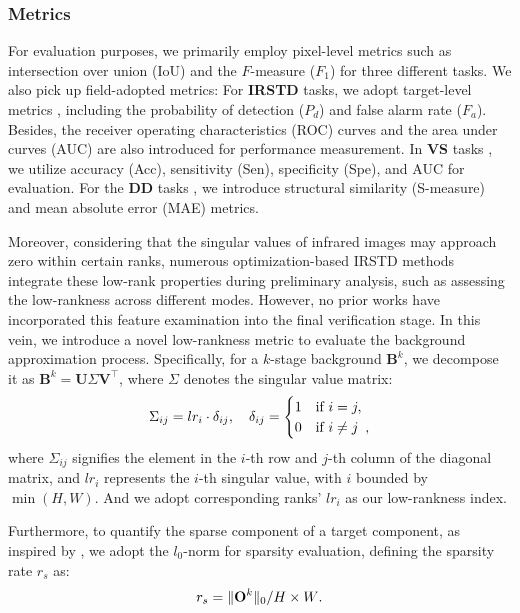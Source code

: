 \documentclass[10pt,journal,compsoc]{IEEEtran}
\begin{document}
\subsubsection{Metrics}
\label{sec:4.1.3}
For evaluation purposes, we primarily employ pixel-level metrics such as intersection over union (IoU) and the \(F\)-measure (\(F_1\)) for three different tasks. We also pick up field-adopted metrics: For \textbf{IRSTD} tasks, we adopt target-level metrics \cite{ying-2023-lesps}, including the probability of detection (\(P_d\)) and false alarm rate (\(F_a\)). Besides, the receiver operating characteristics (ROC) curves and the area under curves (AUC) are also introduced for performance measurement. In \textbf{VS} tasks \cite{liu-2022-frunet}, we utilize accuracy (Acc), sensitivity (Sen), specificity (Spe), and AUC for evaluation. For the \textbf{DD} tasks \cite{song-2020-MCITF}, we introduce structural similarity (S-measure) and mean absolute error (MAE) metrics.

Moreover, considering that the singular values of infrared images may approach zero within certain ranks, numerous optimization-based IRSTD methods integrate these low-rank properties during preliminary analysis, such as assessing the low-rankness across different modes. However, no prior works have incorporated this feature examination into the final verification stage. In this vein, we introduce a novel low-rankness metric to evaluate the background approximation process. Specifically, for a \(k\)-stage background \(\mathbf{B}^k\), we decompose it as \(\mathbf{B}^k = \mathbf{U} \Sigma \mathbf{V}^\top\), where \(\Sigma\) denotes the singular value matrix:
\begin{equation}
\setlength{\abovedisplayskip}{2pt}
\setlength{\belowdisplayskip}{2pt}
    \Sigma_{ij} = lr_i \cdot \delta_{ij}, \quad \delta_{ij} = 
    \begin{cases} 
    1 & \text{if } i = j, \\
    0 & \text{if } i \neq j\enspace,
    \end{cases}
\end{equation}
where \( \Sigma_{ij} \) signifies the element in the \( i \)-th row and \( j \)-th column of the diagonal matrix, and \( lr_i \) represents the \( i \)-th singular value, with \( i \) bounded by \(\min(H,W)\). And we adopt corresponding ranks' \( lr_i \) as our low-rankness index.

Furthermore, to quantify the sparse component of a target component, as inspired by \cite{yu-2024-whitebox}, we adopt the \(l_0\)-norm for sparsity evaluation, defining the sparsity rate \(r_s\) as:
\begin{equation}
\setlength{\abovedisplayskip}{1pt}
\setlength{\belowdisplayskip}{1pt}
    r_s = {\|\mathbf{O}^k\|_0}/{{H \times W}}.
\end{equation}
\end{document}
